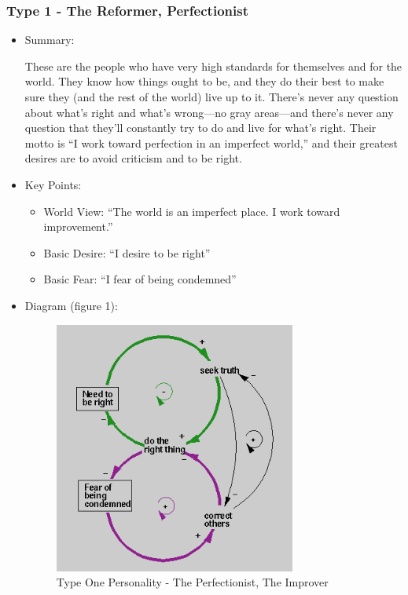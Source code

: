 \documentclass[openleft,oneside,showtrims]{memoir}
\begin{document}
\subsubsection*{Type 1 - The Reformer, Perfectionist}
\label{sec:org9dc1442}
\begin{itemize}
\item Summary:
\label{sec:orgf66d9e4}

These are the people who have very high standards for themselves and for the world. They know how things ought to be, and they do their best to make sure they (and the rest of the world) live up to it. There's never any question about what's right and what's wrong—no gray areas—and there's never any question that they'll constantly try to do and live for what's right. Their motto is ``I work toward perfection in an imperfect world,'' and their greatest desires are to avoid criticism and to be right.

\item Key Points:
\label{sec:org82be488}

\begin{itemize}
\item World View: ``The world is an imperfect place. I work toward improvement.''
\item Basic Desire: ``I desire to be right''
\item Basic Fear: ``I fear of being condemned''
\end{itemize}

\item Diagram (figure 1):
\label{sec:orgfa79347}

\begin{figure}[htbp]
\centering
\includegraphics[width=300px]{./media/Type-1-Reformer.png}
\caption{\label{fig:001}Type One Personality - The Perfectionist, The Improver}
\end{figure}


\end{itemize}
\end{document}
